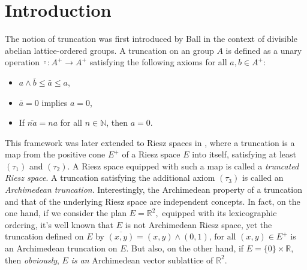 \documentclass{birkau}
\numberwithin{equation}{section}
\theoremstyle{plain}
\theoremstyle{definition}
\begin{document}
\maketitle


\section{Introduction}
The notion of truncation was first introduced by Ball \cite{Ball1,Ball2} in the
context of divisible abelian lattice-ordered groups. A
truncation on an group $A$ is defined as a unary operation $\bar{\cdot
}: A^{+} \rightarrow A^{+}$ satisfying the following axioms for all $a,b \in
A^{+}$:
\begin{itemize}
	\item[$(\tau_{1})$] $a \wedge\bar{b} \leq\bar{a} \leq a$, 
	\item[$(\tau_{2})$] $\bar{a} = 0$ implies $a = 0$, 
	\item[$(\tau_{3})$] If $\overline{na} = na$ for all $n \in\mathbb{N}$, then $a
	= 0$.
\end{itemize}
This framework was later extended to Riesz spaces in \cite{bouhafsimahfoudhi}, where a
truncation is a map from the positive cone $E^{+}$ of a Riesz space $E$ into
itself, satisfying at least $(\tau_{1})$ and $(\tau_{2})$. A Riesz space
equipped with such a map is called a \emph{truncated Riesz space}.
A truncation satisfying the additional axiom $(\tau_{3})$ is called an
\emph{Archimedean truncation}. Interestingly, the Archimedean property of a
truncation and that of the underlying Riesz space are independent concepts. In
fact, on the one hand, if we consider the plan $E=%
\mathbb{R}
^{2},$ equipped with its lexicographic ordering, it's well known that $E$ is
not Archimedean Riesz space, yet the truncation defined on $E$ by
$ 
\overline{\left(  x,y\right)  }=\left(  x,y\right)  \wedge\left(  0,1\right)
\text{, for all }\left(  x,y\right)  \in E^{+}%
$ 
is an Archimedean truncation on $E$. But also, on the other hand, if
$E=\{0\}\times\mathbb{R}$, then \textit{obviously}, $E$ \textit{is an
}Archimedean vector sublattice of $%
\mathbb{R}
^{2}$. 
\end{document}
